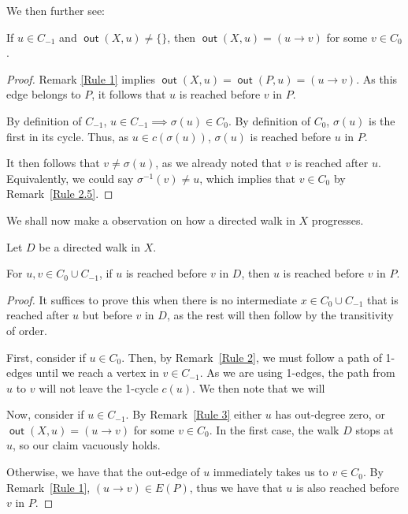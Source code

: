 \documentclass{article}
\DeclareMathOperator{\out}{\bm{\mathsf{out}}}
\newcommand{\dc}[1]{}%
\begin{document}
\vspace{1.75em}
We then further see:
\begin{rmk} \label{Rule 3} If $u \in C_{-1}$ and $\out(X,u) \neq \{\}$\dc{ tail}, then $\out(X,u) = (u \to v)$ for some $v \in C_0$. 
\begin{proof}Remark \ref{Rule 1} implies $\out(X,u)= \out(P,u) = (u\to v)$. As this edge belongs to $P$, it follows that $u$ is reached before $v$ in $P$. 

\vspace{.75em}

By definition of $C_{-1}$, $u \in C_{-1} \implies \sigma(u) \in C_0$. By definition of $C_0$, $\sigma(u)$ is the first in its cycle. Thus, as $u \in c(\sigma(u))$, $\sigma(u)$ is reached before $u$ in $P$.

\vspace{.75em}

It then follows that $v\neq \sigma(u)$, as we already noted that $v$ is reached after $u$. Equivalently, we could say $\sigma^{-1}(v) \neq u$, which implies that $v \in C_0$ by Remark~\ref{Rule 2.5}.\end{proof}

\end{rmk}



\vspace{1.75em}

We shall now make a observation on how a directed walk in $X$ progresses. 

\begin{lem}\label{walking} Let $D$ be a directed walk in $X$.

For $u,v \in C_0 \cup C_{-1}$, if $u$ is reached before $v$ in $D$, then $u$ is reached before $v$ in $P$.
\begin{proof}

It suffices to prove this when there is no intermediate $x \in C_0 \cup C_{-1}$ that is reached after $u$ but before $v$ in $D$, as the rest will then follow by the transitivity of order.

\vspace{.75em}
First, consider if $u \in C_0$. Then, by Remark~\ref{Rule 2}, we must follow a path of 1-edges until we reach a vertex in $v \in C_{-1}$. As we are using 1-edges, the path from $u$ to $v$ will not leave the 1-cycle $c(u)$. We then note that we will

\vspace{.75em}
Now, consider if $u \in C_{-1}$. By Remark~\ref{Rule 3} either $u$ has out-degree zero, or $\out(X,u) = (u \to v)$ for some $v \in C_0$. In the first case, the walk $D$ stops at $u$, so our claim vacuously holds. 

Otherwise, we have that the out-edge of $u$ immediately takes us to $v \in C_0$. By Remark~\ref{Rule 1}, $(u \to v) \in E(P)$, thus we have that $u$ is also reached before $v$ in $P$.
\end{proof}
\end{lem}
\end{document}
